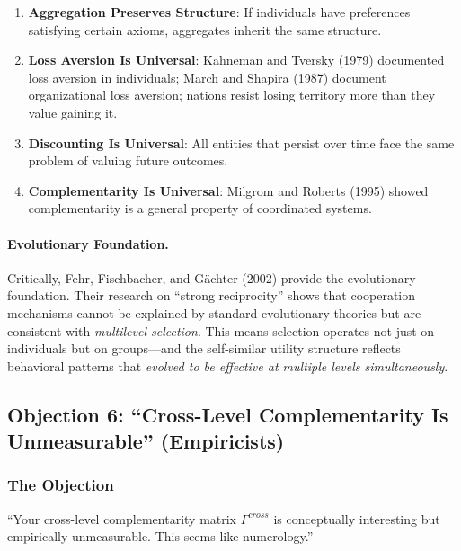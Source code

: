 \begin{enumerate}
\item \textbf{Aggregation Preserves Structure}: If individuals have preferences 
satisfying certain axioms, aggregates inherit the same structure.
\item \textbf{Loss Aversion Is Universal}: Kahneman and Tversky (1979) documented 
loss aversion in individuals; March and Shapira (1987) document organizational 
loss aversion; nations resist losing territory more than they value gaining it.
\item \textbf{Discounting Is Universal}: All entities that persist over time face 
the same problem of valuing future outcomes.
\item \textbf{Complementarity Is Universal}: Milgrom and Roberts (1995) showed 
complementarity is a general property of coordinated systems.
\end{enumerate}

\paragraph{Evolutionary Foundation.}

Critically, Fehr, Fischbacher, and Gächter (2002) provide the evolutionary 
foundation. Their research on ``strong reciprocity'' shows that cooperation 
mechanisms cannot be explained by standard evolutionary theories but are 
consistent with \textit{multilevel selection}. This means selection operates 
not just on individuals but on groups---and the self-similar utility structure 
reflects behavioral patterns that \textit{evolved to be effective at multiple 
levels simultaneously}.

\subsection{Objection 6: ``Cross-Level Complementarity Is Unmeasurable'' (Empiricists)}

\subsubsection{The Objection}

\begin{tcolorbox}[colback=red!5!white, colframe=red!75!black, title=Empiricist's Objection]
``Your cross-level complementarity matrix $\Gamma^{cross}$ is conceptually 
interesting but empirically unmeasurable. This seems like numerology.''
\end{tcolorbox}

